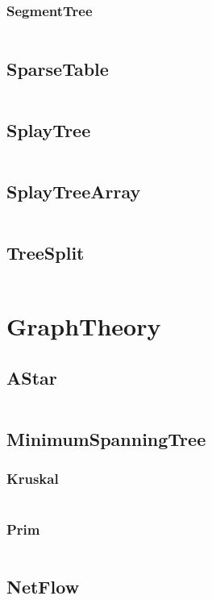 \documentclass[a4paper,11pt]{article}
\begin{document}
\subsubsection{SegmentTree}
\inputminted[breaklines]{c++}{03++DataStructure/+SegmentTree/+SegmentTree.cpp}

\subsection{SparseTable}
\inputminted[breaklines]{c++}{03++DataStructure/+SparseTable.cpp}
\subsection{SplayTree}
\inputminted[breaklines]{c++}{03++DataStructure/+SplayTree.cpp}
\subsection{SplayTreeArray}
\inputminted[breaklines]{c++}{03++DataStructure/+SplayTreeArray.cpp}
\subsection{TreeSplit}
\inputminted[breaklines]{c++}{03++DataStructure/+TreeSplit.cpp}

\newpage
\section{GraphTheory}
\subsection{AStar}
\inputminted[breaklines]{c++}{04++GraphTheory/+AStar.cpp}
\subsection{MinimumSpanningTree}
\subsubsection{Kruskal}
\inputminted[breaklines]{c++}{04++GraphTheory/+MinimumSpanningTree/+Kruskal.cpp}
\subsubsection{Prim}
\inputminted[breaklines]{c++}{04++GraphTheory/+MinimumSpanningTree/+Prim.cpp}

\subsection{NetFlow}
\end{document}
